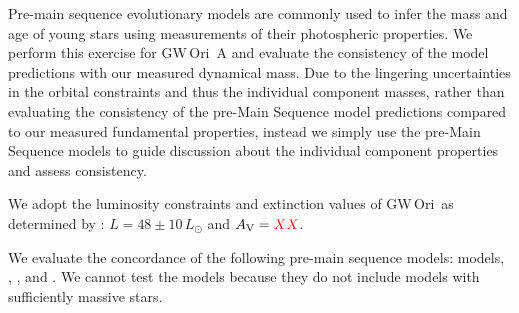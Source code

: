 \documentclass[twocolumn]{aastex61}
\newcommand{\todo}[1]{ \textcolor{red}{#1}}
\newcommand{\gw}{GW\,Ori}
\newcommand{\obj}{\gw}
\begin{document}






Pre-main sequence evolutionary models are commonly used to infer the mass and age of young stars using measurements of their photospheric properties. We perform this exercise for \gw~A and evaluate the consistency of the model predictions with our measured dynamical mass. Due to the lingering uncertainties in the orbital constraints and thus the individual component masses, rather than evaluating the consistency of the pre-Main Sequence model predictions compared to our measured fundamental properties, instead we simply use the pre-Main Sequence models to guide discussion about the individual component properties and assess consistency.

We adopt the luminosity constraints and extinction values of \obj\ as determined by \citet{fang14}: $L = 48 \pm 10\,L_\odot$ and $A_\mathrm{V} = \todo{XX}$.

We evaluate the concordance of the following pre-main sequence models: \citet{choi16} models, \citet{dotter08}, \citet{tognelli11}, and \citet{siess00}. We cannot test the \citet{baraffe15} models because they do not include models with sufficiently massive stars.
\end{document}
